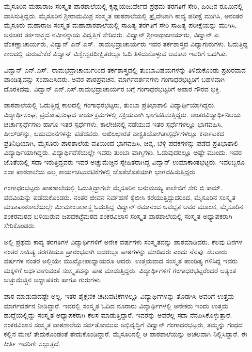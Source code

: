 {ಮೈಸೂರಿನ ಮಹಾರಾಜ ಸಂಸ್ಕೃತ ಪಾಠಶಾಲೆಯಲ್ಲಿ ಕೃಷ್ಣಯಜುರ್ವೇದ ಪ್ರಥಮ ತರಗತಿಗೆ ಸೇರಿ, ಹಿಂದಿನ ರೂಮಿನಲ್ಲಿ ವಾಸಿಸುತ್ತಿದ್ದರು. ಮೈಸೂರಿನ ಶ್ರೀರಾಮಮಿಶ್ರ ಸಂಸ್ಕೃತ ಪಾಠಶಾಲೆಯಲ್ಲಿ ಪ್ರೈವೇಟಾಗಿ ಕಾವ್ಯ ಪರೀಕ್ಷೆ ಮುಗಿಸಿ, ಅನಂತರ ಮೈಸೂರು ಮಹಾರಾಜ ಸಂಸ್ಕೃತ ಮಹಾಪಾಠಶಾಲೆಯಲ್ಲಿ ಸಾಹಿತ್ಯ ತರಗತಿಗೆ ಸೇರಿ ಸಾಹಿತ್ಯ ಪರೀಕ್ಷೆ\-ಯನ್ನು ಮುಗಿಸಿ, ಅನಂತರ ತರ್ಕಶಾಸ್ತ್ರದ ನವೀನನ್ಯಾಯ ವಿದ್ವತ್ತಿಗೆ ಸೇರಿದರು. ವಿದ್ವಾನ್ ಶ್ರೀನಾಥಾಚಾರ್ಯರು, ವಿದ್ವಾನ್ ಎ. ವೆಂಕಣ್ಣಾಚಾರ್ಯರು, ವಿದ್ವಾನ್ ಎನ್.ಎಸ್.\ ರಾಮಭದ್ರಾಚಾರ್ಯರು ಇವರ ತರ್ಕಶಾಸ್ತ್ರದ ವಿದ್ಯಾಗುರುಗಳು. ಓದುತ್ತಿದ್ದ ಕಾಲದಲ್ಲಿ ತುರುವೇಕೆರೆ ವಿದ್ವಾನ್ ವಿಶ್ವೇಶ್ವರದೀಕ್ಷಿತರಲ್ಲೂ ಓದಿ ತಿಳಿದುಕೊಳ್ಳುವ ಅವಕಾಶ ಇವರಿಗೆ ಒದಗಿತು. 

ವಿದ್ವಾನ್ ಎನ್.ಎಸ್.\ ರಾಮಭದ್ರಾಚಾರ್ಯರಿಂದ ತರ್ಕಶಾಸ್ತ್ರದಲ್ಲಿ ತುಂಬಾ\break ವಿಷಯಗಳನ್ನು ತಿಳಿದುಕೊಂಡು ಪ್ರಖರವಾದ ಪಾಂಡಿತ್ಯವನ್ನು ಸಂಪಾದಿಸಿದರು. ಅವರ ಪಾಠಪ್ರವಚನ, ಮಾರ್ಗದರ್ಶನಗಳು ಗಂಗಾಧರಭಟ್ಟರಿಗೆ ಬಹಳವಾಗಿ ದೊರಕಿದವು. ವಿದ್ವಾನ್ ಎನ್.ಎಸ್.ರಾಮಭದ್ರಾಚಾರ್ಯರ ಬಗ್ಗೆ ಗಂಗಾಧರಭಟ್ಟರಿಗೆ ಅಪಾರ ಗೌರವ  \enginline{-}  ಭಕ್ತಿ.

ಪಾಠಶಾಲೆಯಲ್ಲಿ ಓದುತ್ತಿದ್ದ ಕಾಲದಲ್ಲಿ ಗಂಗಾಧರಭಟ್ಟರು, ತುಂಬಾ ಪ್ರತಿಭಾಶಾಲಿ ವಿದ್ಯಾರ್ಥಿಯಾಗಿದ್ದರು. ವಿದ್ಯಾರ್ಥಿಸಂಘ, ಪ್ರದೋಷಸಂಘದ ಕಾರ್ಯಕ್ರಮಗಳಲ್ಲಿ ಸಕ್ರಿಯವಾಗಿ ಭಾಗವಹಿಸುತ್ತಿದ್ದರು. ಅಂತರವಿದ್ಯಾರ್ಥಿನಿಲಯ ಚರ್ಚಾಸ್ಪರ್ಧೆಗಳು ಹಾಗೂ ಇತರ ಸ್ಪರ್ಧೆಗಳು, ಕಾಲೇಜಿನಲ್ಲಿ ನಡೆಯುವ ಇತರ ಸ್ಪರ್ಧೆಗಳಲ್ಲೂ ಭಾಗವಹಿಸಿ, ಷೀಲ್ಡ್‍ನ್ನು, ಬಹುಮಾನಗಳನ್ನು ಪಡೆದವರು. ಅಖಿಲಭಾರತ ವಾಕ್ಪ್ರತಿಯೋಗಿತಾಸ್ಪರ್ಧೆಗಳಲ್ಲೂ ಕರ್ನಾಟಕದ ಪ್ರತಿನಿಧಿಯಾಗಿ, ಮೈಸೂರು ಪಾಠಶಾಲೆಯ ವತಿಯಿಂದ ಭಾಗವಹಿಸಿ, ಚಿನ್ನ, ಬೆಳ್ಳಿ ಪದಕಗಳನ್ನು ಪಡೆದ ಪ್ರತಿಭಾಶಾಲಿ ವಿದ್ಯಾರ್ಥಿಯಾಗಿದ್ದರು. ವಿದ್ಯಾರ್ಥಿದೆಸೆಯಲ್ಲೇ ಇವರು ತುಂಬಾ ವಾಗ್ಮಿಗಳು. ಓದುವುದರಲ್ಲೂ ಅಷ್ಟೇ ಮುಂದು. ಇವರ ಜೊತೆಯಲ್ಲಿ ಸದಾ ಇರುತ್ತಿದ್ದವರು ಇವರ ಅಚ್ಚುಮೆಚ್ಚಿನ ಸ್ನೇಹಿತರಾಗಿದ್ದ ವಿದ್ವಾನ್ ಉಮಾಕಾಂತಭಟ್ಟರು. ಇವರಿಬ್ಬರೂ ಸದಾ ಪಾಠಶಾಲೆಯ ಎಲ್ಲ ಕಾರ್ಯಚಟುವಟಿಕೆಗಳಲ್ಲಿ ಜೊತೆಜೊತೆಯಾಗಿ ಭಾಗವಹಿಸುತ್ತಿದ್ದರು.

ಗಂಗಾಧರಭಟ್ಟರು ಪಾಠಶಾಲೆಯಲ್ಲಿ ಓದುತ್ತಿದ್ದಾಗಲೇ ಮೈಸೂರಿನ ಬನುಮಯ್ಯ ಕಾಲೇಜಿಗೆ ಸೇರಿ ಬಿ.ಕಾಮ್. ಪದವಿಯನ್ನು ಪಡೆದುಕೊಂಡರು. ನಂತರ ಜೀವನ ನಿರ್ವಹಣೆ ಕೈಬೀಸಿ ಕರೆಯುತ್ತಿದ್ದುದರಿಂದ, ಮೈಸೂರಿನ ಸಂಸ್ಕೃತ ಮಹಾಪಾಠಶಾಲೆಯಲ್ಲೇ ಮೀಮಾಂಸಾಶಾಸ್ತ್ರ ಓದುತ್ತಿದ್ದ ವಿದ್ವಾನ್ ರಮಾನಂದ ಅವಭೃತ ಅವರ ಮೂಲಕ, ಮೈಸೂರಿನ ಶಂಕರಮಠದ ಬಳಿಯಿರುವ ಜಪದಕಟ್ಟೆಮಠದ ಶಂಕರವಿಲಾಸ ಸಂಸ್ಕೃತ ಪಾಠಶಾಲೆಯಲ್ಲಿ ಸಂಸ್ಕೃತ ಅಧ್ಯಾಪಕರಾಗಿ ಸೇರಿಕೊಂಡರು.

ಅಲ್ಲಿ ಪ್ರಥಮ  \enginline{-}  ಕಾವ್ಯ ತರಗತಿಗಳ ವಿದ್ಯಾರ್ಥಿಗಳಿಗೆ ಅನೇಕ ವರ್ಷಗಳು ಸಂಸ್ಕೃತವನ್ನು ಪಾಠಮಾಡಿದರು. ಕೆಲವು ದಿನಗಳ ನಂತರ ಸಾಹಿತ್ಯ ತರಗತಿಯೂ ಪ್ರಾರಂಭವಾಗಿ ಅದರಲ್ಲೂ ಪಾಠಗಳನ್ನು ಮಾಡಿದರು ಎಂದು ನೆನಪು. ಕೆಲವಾರು ವರ್ಷಗಳ ನಂತರ ಅಲ್ಲಿಯೇ ಮುಖ್ಯೋಪಾಧ್ಯಾಯರೂ ಆದರು. ಉತ್ತಮವಾದ ಸಂಸ್ಕೃತ ಪಾಂಡಿತ್ಯ ಗಳಿಸಿದ್ದ ಇವರು ಮಕ್ಕಳಿಗೆ ಅರ್ಥವಾಗುವಂತೆ ಸಂಸ್ಕೃತವನ್ನು ಪಾಠ ಮಾಡುತ್ತಿದ್ದರು. ವಿದ್ಯಾರ್ಥಿ\-ಗಳಿಗೆ ಗಂಗಾಧರಭಟ್ಟರೆಂದರೆ ಅತ್ಯಂತ ಅಚ್ಚುಮೆಚ್ಚಿನ ಅಧ್ಯಾಪಕರು ಹಾಗೂ ಗುರುಗಳು. 

ಪಾಠ ಮಾಡುವುದಷ್ಟೇ ಅಲ್ಲ. ಇತರ ಶೈಕ್ಷಣಿಕ ಚಟುವಟಿಕೆಗಳಲ್ಲೂ ವಿದ್ಯಾರ್ಥಿ\-ಗಳನ್ನು ತೊಡಗಿಸಿ ಅವರಿಗೆ ಉತ್ತಮ ಮಾರ್ಗದರ್ಶನ ನೀಡಿದ್ದಾರೆ. ಇವರಲ್ಲಿ ಸಂಸ್ಕೃತ ಓದಿದ ನೂರಾರು ವಿದ್ಯಾರ್ಥಿಗಳಲ್ಲಿ ಅನೇಕರು ಇಂದು ಉತ್ತಮ ಹುದ್ದೆಯಲ್ಲಿದ್ದು ಸಂಸ್ಕೃತ ಅಧ್ಯಾಪಕರಾಗಿ ಕೆಲಸ ಮಾಡುತ್ತಿದ್ದಾರೆ. ಇವರನ್ನು ಅವರೆಲ್ಲ ಸದಾ ನೆನಪಿಸಿಕೊಳ್ಳುತ್ತಾರೆ. ಶಂಕರವಿಲಾಸ ಸಂಸ್ಕೃತ ಪಾಠಶಾಲೆಯ ಸರ್ವತೋಮುಖ ಅಭಿವೃದ್ಧಿಗೆ ವಿದ್ವಾನ್ ಗಂಗಾಧರಭಟ್ಟರು, ತಮ್ಮನ್ನು ಗಂಧದ ಕಲ್ಲಿನ ಮೇಲೆ ತೇದುಕೊಂಡಂತೆ ತೇದುಕೊಂಡಿದ್ದಾರೆ. ಮೈಸೂರಿನಲ್ಲಿ ಆ ಪಾಠಶಾಲೆಯನ್ನು ಅಚಲವಾಗಿ ನಿಲ್ಲಿಸಿದ್ದಾರೆ. ಈ ಕೀರ್ತಿ ಇವರಿಗೇ ಸಲ್ಲುತ್ತದೆ.

}
